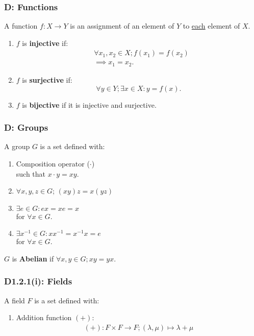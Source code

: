 \documentclass{article}
\begin{document}
\begin{multicols*}{3}
\noindent

\subsubsection*{D: Functions}
A function $f:X\rightarrow Y$ is an assignment
of an element of $Y$ to \underline{each} element of $X$.
\begin{enumerate}
    \item $f$ is \textbf{injective} if:
    \begin{align*}
        &\forall x_1,x_2\in X;
        f(x_1)=f(x_2) \\ &\implies x_1=x_2.
    \end{align*}

    \item $f$ is \textbf{surjective} if:
    $$\forall y\in Y;\exists x\in X: y=f(x).$$

    \item $f$ is \textbf{bijective}
    if it is injective and surjective.
\end{enumerate}

\subsubsection*{D: Groups}
A group $G$ is a set defined with:
\begin{enumerate}
    \item Composition operator ($\cdot$) \\
    such that $x\cdot y=xy$.
    
    \item $\forall x,y,z\in G$; $(xy)z=x(yz)$
    
    \item $\exists e\in G: ex=xe=x$ \\
    for $\forall x\in G$.
    
    \item $\exists x^{-1}\in G: xx^{-1}=x^{-1}x=e$ \\
    for $\forall x\in G$.
\end{enumerate}
$G$ is \textbf{Abelian} if 
$\forall x,y\in G; xy=yx$.

\subsubsection*{D1.2.1(i): Fields}
A field $F$ is a set defined with:
\begin{enumerate}
    \item Addition function $(+)$:
    \begin{align*}
        (+):F\times F\rightarrow F;
        (\lambda,\mu)\mapsto\lambda+\mu
    \end{align*}


\end{enumerate}
\end{multicols*}
\end{document}
